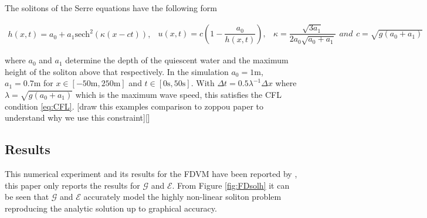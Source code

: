 \documentclass[SingleSpace,12pt,Proceedings]{Serre_ASCE}
\begin{document}
The solitons of the Serre equations have the following form
\begin{linenomath*}
\begin{subequations}
\begin{gather}
h\left(x,t\right) = a_0 + a_1\text{sech}^2\left( \kappa\left(x - ct\right)\right),
\end{gather}
\begin{gather}
u\left(x,t\right) = c\left(1 - \dfrac{a_0}{h(x,t)} \right),
\end{gather}
\begin{gather}
\kappa = \dfrac{\sqrt{3a_1}}{2a_0 \sqrt{ a_0 + a_1}}
\end{gather}
and
\begin{gather}
c = \sqrt{g \left(a_0 + a_1\right)}
\end{gather}
\end{subequations}
\label{eq:sol}
\end{linenomath*}
where $a_0$ and $a_1$ determine the depth of the quiescent water and the maximum height of the soliton above that respectively. In the simulation $a_0 = 1\text{m}$, $a_1 = 0.7\text{m}$ for $x\in\left[-50\text{m},250\text{m}\right]$ and $t\in\left[0\text{s},50\text{s}\right]$. With $\Delta t = 0.5 \lambda^{-1} \Delta x$ where $\lambda = \sqrt{g \left(a_0 + a_1\right)}$ which is the maximum wave speed, this satisfies the CFL condition \eqref{eq:CFL}. [draw this examples comparison to zoppou paper to understand why we use this constraint][] 

\subsection{Results}
This numerical experiment and its results for the FDVM have been reported by , this paper only reports the results for $\mathcal{G}$ and $\mathcal{E}$. From Figure \ref{fig:FDsolh} it can be seen that $\mathcal{G}$ and $\mathcal{E}$ accurately model the highly non-linear soliton problem reproducing the analytic solution up to graphical accuracy.
\end{document}
